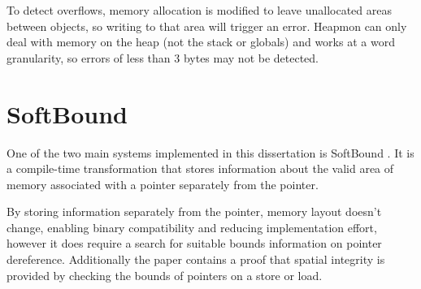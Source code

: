 To detect overflows, memory allocation is modified to leave unallocated areas between objects, so writing to that area will trigger an error.
Heapmon can only deal with memory on the heap (not the stack or globals) and works at a word granularity, so errors of less than 3 bytes may not be detected.

\section{SoftBound}

One of the two main systems implemented in this dissertation is SoftBound \cite{nagarakatte2009softbound}.
It is a compile-time transformation that stores information about the valid area of memory associated with a pointer separately from the pointer.

By storing information separately from the pointer, memory layout doesn't change, enabling binary compatibility and reducing implementation effort, however it does require a search for suitable bounds information on pointer dereference.
Additionally the paper contains a proof that spatial integrity is provided by checking the bounds of pointers on a store or load.

